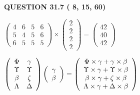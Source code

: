 \documentclass[12pt]{article}
\begin{document}
   
  
\vspace{0.2in}
  
{\textbf{\Large{QUESTION
31.7 
 (          8,         15,         60)
}}}
  
  
 
 
\noindent{}

 
$\left( \begin{array}{ccccccccccccccc}
           4 & 
           6 & 
           5 & 
           6 \\ 
           5 & 
           4 & 
           5 & 
           6 \\ 
           6 & 
           5 & 
           5 & 
           5
\end{array}\right) \times
\left( \begin{array}{c}
           2 \\ 
           2 \\ 
           2 \\ 
           2
\end{array}\right)  =
\left( \begin{array}{c}
          42 \\ 
          40 \\ 
          42
\end{array}\right)  $
 
$  %
 \left( \begin{array}
 {
 c
 c
 }
 \Phi & 
 \gamma \\ 
 \Upsilon & 
 \Upsilon \\ 
 \beta & 
                    \zeta \\ 
 \Lambda & 
 \Delta
 \end{array} \right)
 \left( \begin{array}
 {
 c
 }
 \gamma \\ 
 \beta
 \end{array} \right)
=
  \left( \begin{array}
 {
 c
 }
 \Phi \times  \gamma   +  \gamma \times  \beta \\ 
 \Upsilon \times  \gamma   +  \Upsilon \times  \beta \\ 
 \beta \times  \gamma   +                     \zeta \times  \beta \\ 
 \Lambda \times  \gamma   +  \Delta \times  \beta
 \end{array} \right)
$
 
 
 
 
 
\end{document}
